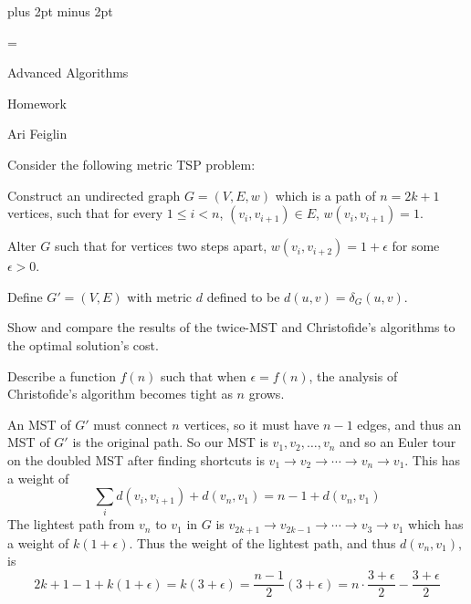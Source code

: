 

\parindent=0pt
\parskip=4pt plus 2pt minus 2pt



\footline={}

\setcounter{section}{2}


\def\printmcount{\the\counter{section}.\the\counter{math counter}}

{

    \centerline{Advanced Algorithms}
    \smallskip
    \centerline{Homework \the{}}
    \centerline{Ari Feiglin}

\eppbox}

\bexerc

    Consider the following metric TSP problem:
    \blist
        \item Construct an undirected graph $G=(V,E,w)$ which is a path of $n=2k+1$ vertices, such that for every $1\leq i<n$, $(v_i,v_{i+1})\in E$, $w(v_i,v_{i+1})=1$.
        \item Alter $G$ such that for vertices two steps apart, $w(v_i,v_{i+2})=1+\epsilon$ for some $\epsilon>0$.
        \item Define $G'=(V,E)$ with metric $d$ defined to be $d(u,v)=\delta_G(u,v)$.
    \elist
    \benum
        \item Show and compare the results of the twice-MST and Christofide's algorithms to the optimal solution's cost.
        \item Describe a function $f(n)$ such that when $\epsilon=f(n)$, the analysis of Christofide's algorithm becomes tight as $n$ grows.
    \eenum

\eexerc

\benum
    \item An MST of $G'$ must connect $n$ vertices, so it must have $n-1$ edges, and thus an MST of $G'$ is the original path.
    So our MST is $v_1,v_2,\dots,v_n$ and so an Euler tour on the doubled MST after finding shortcuts is $v_1\to v_2\to\cdots\to v_n\to v_1$.
    This has a weight of
    $$ \sum_i d(v_i,v_{i+1}) + d(v_n,v_1) = n-1 + d(v_n,v_1) $$
    The lightest path from $v_n$ to $v_1$ in $G$ is $v_{2k+1}\to v_{2k-1}\to\cdots\to v_3\to v_1$ which has a weight of $k(1+\epsilon)$.
    Thus the weight of the lightest path, and thus $d(v_n,v_1)$, is 
    $$ 2k+1-1+k(1+\epsilon)=k(3+\epsilon)=\frac{n-1}2(3+\epsilon) = n\cdot\frac{3+\epsilon}2 - \frac{3+\epsilon}2 $$

